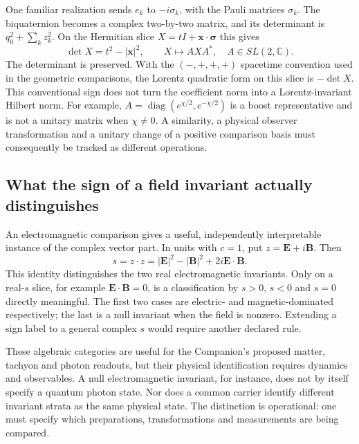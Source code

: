 \documentclass[11pt,a4paper]{article}
\begin{document}
One familiar realization sends $e_k$ to $-i\sigma_k$, with the Pauli
matrices $\sigma_k$. The biquaternion becomes a complex two-by-two
matrix, and its determinant is $q_0^2+\sum_kz_k^2$. On the Hermitian
slice $X=tI+\boldsymbol x\cdot\boldsymbol\sigma$ this gives
\begin{equation}
 \det X=t^2-|\boldsymbol x|^2,\qquad
 X\longmapsto AXA^*,\quad A\in SL(2,\mathbb C).
\end{equation}
The determinant is preserved. With the $(-,+,+,+)$ spacetime
convention used in the geometric comparisons, the Lorentz quadratic
form on this slice is $-\det X$. This conventional sign does not
turn the coefficient norm into a Lorentz-invariant Hilbert norm.
For example, $A=\operatorname{diag}(e^{\chi/2},e^{-\chi/2})$
is a boost representative and is not a unitary matrix when
$\chi\ne0$. A similarity, a physical observer transformation and
a unitary change of a positive comparison basis must consequently be
tracked as different operations.

\subsection{What the sign of a field invariant actually distinguishes}
An electromagnetic comparison gives a useful, independently interpretable
instance of the complex vector part. In units with $c=1$, put
$z=\boldsymbol E+i\boldsymbol B$. Then
\begin{equation}
 s=z\cdot z=|\boldsymbol E|^2-|\boldsymbol B|^2
                 +2i\boldsymbol E\cdot\boldsymbol B.
\end{equation}
This identity distinguishes the two real electromagnetic invariants.
Only on a real-$s$ slice, for example
$\boldsymbol E\cdot\boldsymbol B=0$, is a classification by
$s>0$, $s<0$ and $s=0$ directly meaningful. The first two cases are
electric- and magnetic-dominated respectively; the last is a null
invariant when the field is nonzero. Extending a sign label to a
general complex $s$ would require another declared rule.

These algebraic categories are useful for the Companion's proposed
matter, tachyon and photon readouts, but their physical identification
requires dynamics and observables. A null electromagnetic invariant,
for instance, does not by itself specify a quantum photon state.
Nor does a common carrier identify different invariant strata as the
same physical state. The distinction is operational: one must specify
which preparations, transformations and measurements are being compared.
\end{document}
